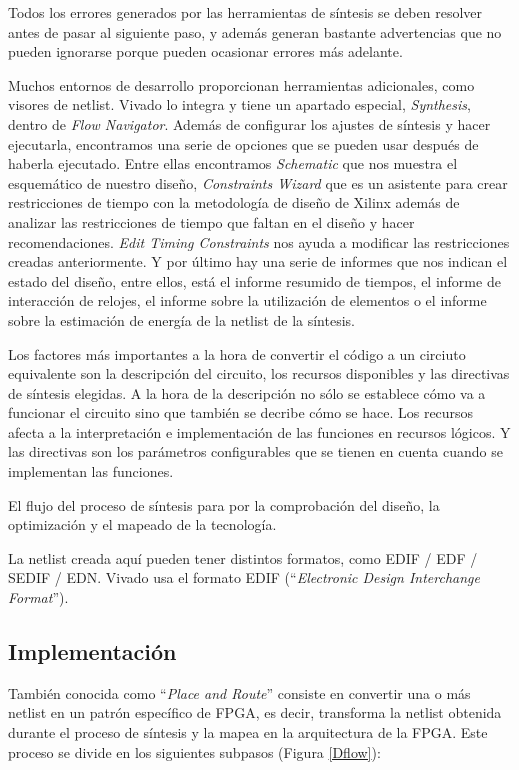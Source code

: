 Todos los errores generados por las herramientas de síntesis se deben resolver antes de pasar al siguiente 
paso, y además generan bastante advertencias que no pueden ignorarse porque pueden ocasionar errores más adelante.

Muchos entornos de desarrollo proporcionan herramientas adicionales, como visores de netlist. Vivado lo integra y
 tiene un apartado especial, \textit{Synthesis}, dentro de \textit{Flow Navigator}. Además de 
configurar los ajustes de síntesis y hacer ejecutarla, encontramos una serie de opciones que se pueden usar 
después de haberla ejecutado. Entre ellas encontramos \textit{Schematic} que nos muestra el esquemático de nuestro 
diseño, \textit{Constraints Wizard} que es un asistente para crear restricciones de tiempo con la metodología 
de diseño de Xilinx además de analizar las restricciones de tiempo que faltan en el diseño y hacer recomendaciones. 
\textit{Edit Timing Constraints} nos ayuda a modificar las restricciones creadas anteriormente. Y por último 
hay una serie de informes que nos indican el estado del diseño, entre ellos, está el informe resumido de tiempos, 
el informe de interacción de relojes, el informe sobre la utilización de elementos o el informe sobre la estimación 
de energía de la netlist de la síntesis. 

Los factores más importantes a la hora de convertir el código a un circiuto equivalente son la descripción 
del circuito, los recursos disponibles y las directivas de síntesis elegidas. A la hora de la descripción 
no sólo se establece cómo va a funcionar el circuito sino que también se decribe cómo se hace. Los recursos 
afecta a la interpretación e implementación de las funciones en recursos lógicos. Y las directivas son los 
parámetros configurables que se tienen en cuenta cuando se implementan las funciones.

El flujo del proceso de síntesis para por la comprobación del diseño, la optimización y el mapeado de la tecnología.

La netlist creada aquí pueden tener distintos formatos, como EDIF / EDF / SEDIF / EDN. Vivado usa el formato 
EDIF (``\textit{Electronic Design Interchange Format}'').

\subsection{Implementación}
\renewcommand{\theenumi}{\arabic{enumi}}

También conocida como ``\textit{Place and Route}'' consiste en convertir una o más netlist en un patrón específico 
de FPGA, es decir, transforma la netlist obtenida durante el proceso de síntesis y la mapea en la arquitectura 
de la FPGA. Este proceso se divide en los siguientes subpasos (Figura \ref{Dflow}):

